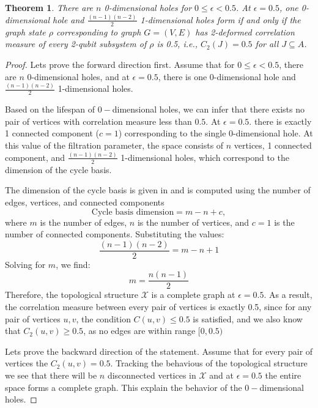 \documentclass{article}
\newtheorem{theorem}{Theorem}
\begin{document}
\begin{theorem}
\label{thm:betti_number_iff_2-entropy}
There are $ n $ 0-dimensional holes for $ 0 \leq \epsilon < 0.5 $. At $ \epsilon = 0.5 $, one 0-dimensional hole and $ \frac{(n-1)(n-2)}{2} $ 1-dimensional holes form if and only if the graph state $\rho$ corresponding to graph $G =(V, E)$ has 2-deformed correlation measure of every 2-qubit subsystem of $\rho$ is 0.5, i.e., $C_2(J) = 0.5$ for all $J \subseteq A$.
\end{theorem}
\begin{proof}
Lets prove the forward direction first. Assume that for $ 0 \leq \epsilon < 0.5 $, there are $ n $ 0-dimensional holes, and at $ \epsilon = 0.5 $, there is one 0-dimensional hole and $ \frac{(n-1)(n-2)}{2} $ 1-dimensional holes.

Based on the lifespan of $0-$dimensional holes, we can infer that there exists no pair of vertices with correlation measure less than $0.5$. At $\epsilon = 0.5$. there is exactly 1 connected component ($ c = 1 $) corresponding to the single 0-dimensional hole. At this value of the filtration parameter, the space consists of $ n $ vertices, 1 connected component, and $ \frac{(n-1)(n-2)}{2} $ 1-dimensional holes, which correspond to the dimension of the cycle basis.

The dimension of the cycle basis is given in \cite{hage1996island} and is computed using the number of edges, vertices, and connected components
\begin{equation}
\text{Cycle basis dimension} = m - n + c,
\end{equation}
where $ m $ is the number of edges, $ n $ is the number of vertices, and $ c = 1 $ is the number of connected components. Substituting the values:
\begin{equation}
\frac{(n-1)(n-2)}{2} = m - n + 1
\end{equation}
Solving for $ m $, we find:
\begin{equation}
m = \frac{n(n-1)}{2}
\end{equation}
Therefore, the topological structure $ \mathcal{X} $ is a complete graph at $ \epsilon = 0.5 $. As a result, the correlation measure between every pair of vertices is exactly 0.5, since for any pair of vertices $ u, v $, the condition $ C(u, v) \leq 0.5 $ is satisfied, and we also know that $ C_2(u, v) \geq 0.5 $, as no edges are within range $[0, 0.5)$

Lets prove the backward direction of the statement. Assume that for every pair of vertices the $C_2(u, v) = 0.5$. Tracking the behavious of the topological structure we see that there will be $n$ disconnected vertices in $\mathcal{X}$ and at $\epsilon=0.5$ the entire space forms a complete graph. This explain the behavior of the $0-$dimensional holes.


\end{proof}
\end{document}
